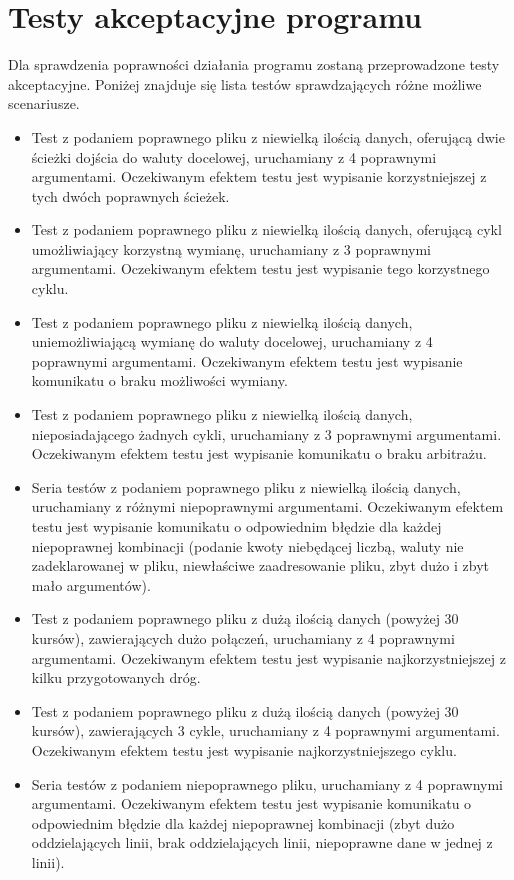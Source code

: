 \documentclass[a4paper,11pt]{article}
\newcommand\tab[1][0.6cm]{\hspace*{#1}}
\begin{document}
\section{Testy akceptacyjne programu}

\tab Dla sprawdzenia poprawności działania programu zostaną przeprowadzone testy akceptacyjne. Poniżej znajduje się lista testów sprawdzających różne możliwe scenariusze.

\begin{itemize}

\item Test z podaniem poprawnego pliku z niewielką ilością danych, oferującą dwie ścieżki dojścia do waluty docelowej, uruchamiany z 4 poprawnymi argumentami. Oczekiwanym efektem testu jest wypisanie korzystniejszej z tych dwóch poprawnych ścieżek. 

\item Test z podaniem poprawnego pliku z niewielką ilością danych, oferującą cykl umożliwiający korzystną wymianę, uruchamiany z 3 poprawnymi argumentami. Oczekiwanym efektem testu jest wypisanie tego korzystnego cyklu. 

\item Test z podaniem poprawnego pliku z niewielką ilością danych, uniemożliwiającą wymianę do waluty docelowej, uruchamiany z 4 poprawnymi argumentami. Oczekiwanym efektem testu jest wypisanie komunikatu o braku możliwości wymiany.

\item Test z podaniem poprawnego pliku z niewielką ilością danych, nieposiadającego żadnych cykli, uruchamiany z 3 poprawnymi argumentami. Oczekiwanym efektem testu jest wypisanie komunikatu o braku arbitrażu.

\item Seria testów z podaniem poprawnego pliku z niewielką ilością danych, uruchamiany z różnymi niepoprawnymi argumentami. Oczekiwanym efektem testu jest wypisanie komunikatu o odpowiednim błędzie dla każdej niepoprawnej kombinacji (podanie kwoty niebędącej liczbą, waluty nie zadeklarowanej w pliku, niewłaściwe zaadresowanie pliku, zbyt dużo i zbyt mało argumentów).

\item Test z podaniem poprawnego pliku z dużą ilością danych (powyżej 30 kursów), zawierających dużo połączeń, uruchamiany z 4 poprawnymi argumentami. Oczekiwanym efektem testu jest wypisanie najkorzystniejszej z kilku przygotowanych dróg.

\item Test z podaniem poprawnego pliku z dużą ilością danych (powyżej 30 kursów), zawierających 3 cykle, uruchamiany z 4 poprawnymi argumentami. Oczekiwanym efektem testu jest wypisanie najkorzystniejszego cyklu.

\item Seria testów z podaniem niepoprawnego pliku, uruchamiany z 4 poprawnymi argumentami. Oczekiwanym efektem testu jest wypisanie komunikatu o odpowiednim błędzie dla każdej niepoprawnej kombinacji (zbyt dużo oddzielających linii, brak oddzielających linii, niepoprawne dane w jednej z linii).

\end{itemize}
\end{document}
